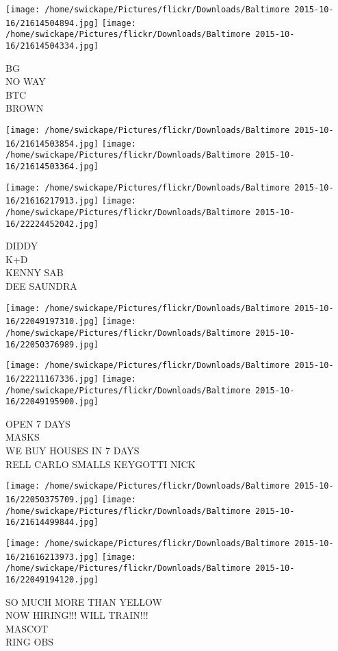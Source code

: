 \documentclass[10pt,letterpaper]{article}
\begin{document}
\texttt{[image: /home/swickape/Pictures/flickr/Downloads/Baltimore 2015-10-16/21614504894.jpg]}
\texttt{[image: /home/swickape/Pictures/flickr/Downloads/Baltimore 2015-10-16/21614504334.jpg]}

BG\\
NO WAY\\
BTC\\
BROWN
\pagebreak

\texttt{[image: /home/swickape/Pictures/flickr/Downloads/Baltimore 2015-10-16/21614503854.jpg]}
\texttt{[image: /home/swickape/Pictures/flickr/Downloads/Baltimore 2015-10-16/21614503364.jpg]}

\texttt{[image: /home/swickape/Pictures/flickr/Downloads/Baltimore 2015-10-16/21616217913.jpg]}
\texttt{[image: /home/swickape/Pictures/flickr/Downloads/Baltimore 2015-10-16/22224452042.jpg]}

DIDDY\\
K+D\\
KENNY SAB\\
DEE SAUNDRA
\pagebreak

\texttt{[image: /home/swickape/Pictures/flickr/Downloads/Baltimore 2015-10-16/22049197310.jpg]}
\texttt{[image: /home/swickape/Pictures/flickr/Downloads/Baltimore 2015-10-16/22050376989.jpg]}

\texttt{[image: /home/swickape/Pictures/flickr/Downloads/Baltimore 2015-10-16/22211167336.jpg]}
\texttt{[image: /home/swickape/Pictures/flickr/Downloads/Baltimore 2015-10-16/22049195900.jpg]}

OPEN 7 DAYS\\
MASKS\\
WE BUY HOUSES IN 7 DAYS\\
RELL CARLO SMALLS KEYGOTTI NICK
\pagebreak

\texttt{[image: /home/swickape/Pictures/flickr/Downloads/Baltimore 2015-10-16/22050375709.jpg]}
\texttt{[image: /home/swickape/Pictures/flickr/Downloads/Baltimore 2015-10-16/21614499844.jpg]}

\texttt{[image: /home/swickape/Pictures/flickr/Downloads/Baltimore 2015-10-16/21616213973.jpg]}
\texttt{[image: /home/swickape/Pictures/flickr/Downloads/Baltimore 2015-10-16/22049194120.jpg]}

SO MUCH MORE THAN YELLOW\\
NOW HIRING!!! WILL TRAIN!!!\\
MASCOT\\
RING OBS
\pagebreak
\end{document}
